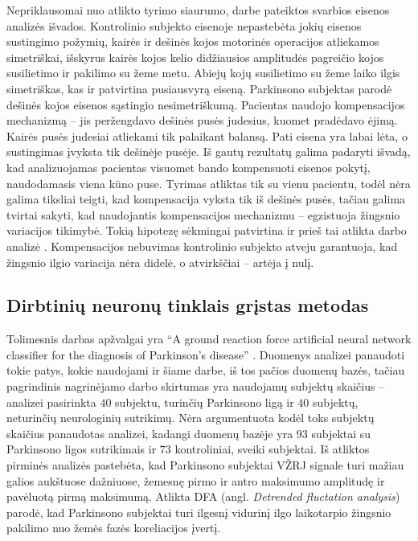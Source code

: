 \documentclass[]{vgtuef}
\begin{document}
Nepriklausomai nuo atlikto tyrimo siaurumo, darbe pateiktos svarbios eisenos analizės išvados. Kontrolinio subjekto eisenoje nepastebėta jokių eisenos sustingimo požymių, kairės ir dešinės kojos motorinės operacijos atliekamos simetriškai, išskyrus kairės kojos kelio didžiausios amplitudės pagreičio kojos susilietimo ir pakilimo su žeme metu. Abiejų kojų susilietimo su žeme laiko ilgis simetriškas, kas ir patvirtina pusiausvyrą eiseną. Parkinsono subjektas parodė dešinės kojos eisenos sąstingio nesimetriškumą. Pacientas naudojo kompensacijos mechanizmą -- jis peržengdavo dešinės pusės judesius, kuomet pradėdavo ėjimą. Kairės pusės judesiai atliekami tik palaikant balansą. Pati eisena yra labai lėta, o sustingimas įvyksta tik dešinėje pusėje. Iš gautų rezultatų galima padaryti išvadą, kad analizuojamas pacientas visuomet bando kompensuoti eisenos pokytį, naudodamasis viena kūno puse. Tyrimas atliktas tik su vienu pacientu, todėl nėra galima tiksliai teigti, kad kompensacija vyksta tik iš dešinės pusės, tačiau galima tvirtai sakyti, kad naudojantis kompensacijos mechanizmu -- egzistuoja žingsnio variacijos tikimybė. Tokią hipotezę sėkmingai patvirtina ir prieš tai atlikta darbo analizė \cite{5280353}. Kompensacijos nebuvimas kontrolinio subjekto atveju garantuoja, kad žingsnio ilgio variacija nėra didelė, o atvirkščiai -- artėja į nulį.

\subsection{Dirbtinių neuronų tinklais grįstas metodas}


Tolimesnis darbas apžvalgai yra ``A ground reaction force artificial neural network classifier for the diagnosis of Parkinson's disease'' \cite{vgtu}. Duomenys analizei panaudoti tokie patys, kokie naudojami ir šiame darbe, iš tos pačios duomenų bazės, tačiau pagrindinis nagrinėjamo darbo skirtumas yra naudojamų subjektų skaičius -- analizei pasirinkta $40$ subjektu, turinčių Parkinsono ligą ir $40$ subjektų, neturinčių neurologinių sutrikimų. Nėra argumentuota kodėl toks subjektų skaičius panaudotas analizei, kadangi duomenų bazėje yra $93$ subjektai su Parkinsono ligos sutrikimais ir $73$ kontroliniai, sveiki subjektai. Iš atliktos pirminės analizės pastebėta, kad Parkinsono subjektai VŽRJ signale turi mažiau galios aukštuose dažniuose, žemesnę pirmo ir antro maksimumo amplitudę ir pavėluotą pirmą maksimumą. Atlikta DFA (angl. \textit{Detrended fluctation analysis}) parodė, kad Parkinsono subjektai turi ilgesnį vidurinį ilgo laikotarpio žingsnio pakilimo nuo žemės fazės koreliacijos įvertį.
\end{document}
